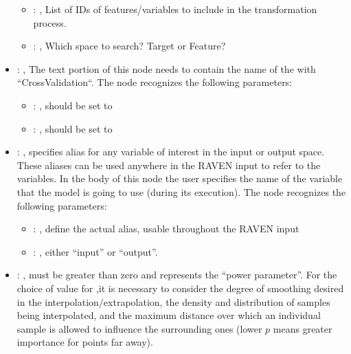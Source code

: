 \begin{itemize}
\begin{itemize}
        \item {}: , 
          List of IDs of features/variables to include in the transformation process.

        \item {}: , 
          Which space to search? Target or Feature?
      \end{itemize}

    \item {}: , 
      The text portion of this node needs to contain the name of the  with
               ``CrossValidation``.
      The  node recognizes the following parameters:
        \begin{itemize}
          \item {}: , 
            should be set to 
          \item {}: , 
            should be set to 
      \end{itemize}

    \item {}: , 
      specifies alias for         any variable of interest in the input or output space. These
      aliases can be used anywhere in the RAVEN input to         refer to the variables. In the body
      of this node the user specifies the name of the variable that the model is going to use
      (during its execution).
      The  node recognizes the following parameters:
        \begin{itemize}
          \item {}: , 
            define the actual alias, usable throughout the RAVEN input
          \item {}: , 
            either ``input'' or ``output''.
      \end{itemize}

    \item {}: , 
      must be greater than zero and represents the ``power parameter''.
      For the choice of value for ,it is necessary to consider the degree
      of smoothing desired in the interpolation/extrapolation, the density and
      distribution of samples being interpolated, and the maximum distance over
      which an individual sample is allowed to influence the surrounding ones (lower
      $p$ means greater importance for points far away).
  \end{itemize}

